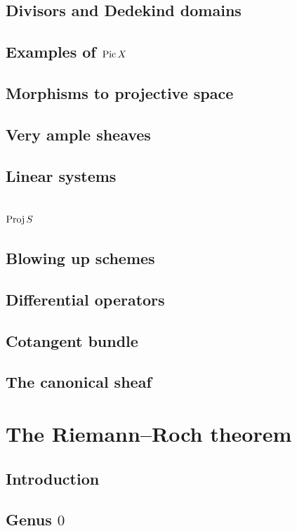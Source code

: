 \documentclass [11 pt, oneside] {article}
\begin{document}
\subsection{Divisors and Dedekind domains}
\subsection[Examples of Picard groups]{Examples of $\operatorname{Pic} X$}
\subsection{Morphisms to projective space}
\subsection{Very ample sheaves}
\subsection{Linear systems}
\subsection[The Proj construction]{$\operatorname{Proj} S$}
\subsection{Blowing up schemes}
\subsection{Differential operators}
\subsection{Cotangent bundle}
\subsection{The canonical sheaf}


\section{The Riemann--Roch theorem}
\subsection{Introduction}
\subsection{Genus \texorpdfstring{$0$}{0}}
\end{document}
